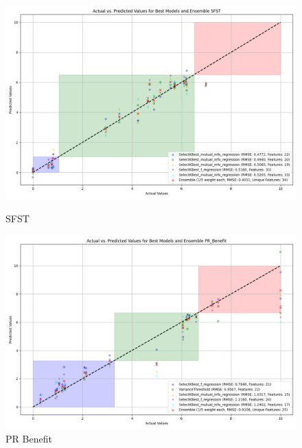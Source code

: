 \begin{figure}[H]
    \centering
    \begin{minipage}{0.45\textwidth}
        \centering
        \includegraphics[width=\linewidth]{reg_section_specxtra/images_reg_featred_ensemble/actual_vs_predicted_best_feature_selection_and_ensemble_SFST.png}
        \caption{SFST}
        \label{fig_reg_specxtra:sfst_reg_featred_best_ensemble}
    \end{minipage}\hfill
    \begin{minipage}{0.45\textwidth}
        \centering
        \includegraphics[width=\linewidth]{reg_section_specxtra/images_reg_featred_ensemble/actual_vs_predicted_best_feature_selection_and_ensemble_PR_Benefit.png}
        \caption{PR Benefit}
        \label{fig_reg_specxtra:pr_ben_reg_featred_best_ensemble}
    \end{minipage}
\end{figure}

